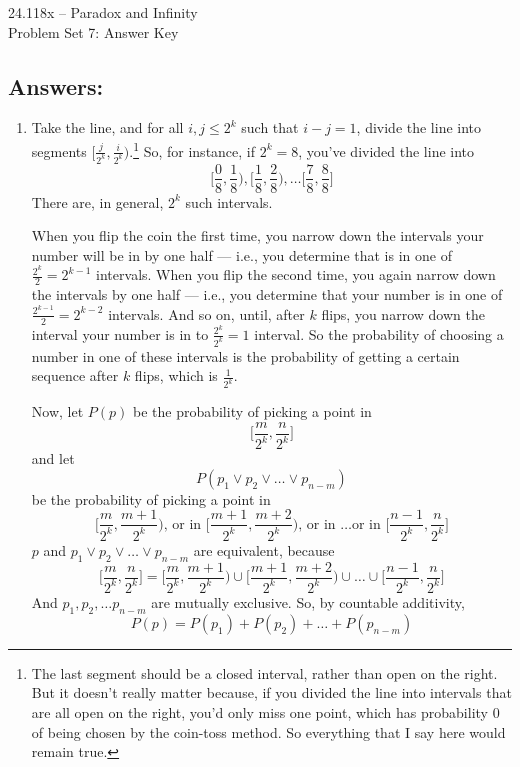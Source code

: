 \documentclass[12pt,a4paper]{article}
\begin{document}
\begin{center} {\large 24.118x -- Paradox and Infinity \\ \vspace{1mm}}
 {\large Problem Set 7: Answer Key \\ \vspace{1mm}}
 
\end{center}
\vspace{3mm}


\subsection*{Answers:}


\begin{enumerate}

\item Take the line, and for all $i,j \le 2^k$ such that $i-j=1$, divide the line into segments $[\frac{j}{2^k}, \frac{i}{2^k})$.\footnote{The last segment should be a closed interval, rather than open on the right. But it doesn't really matter because, if you divided the line into intervals that are all open on the right, you'd only miss one point, which has probability 0 of being chosen by the coin-toss method. So everything that I say here would remain true.} So, for instance, if $2^k=8$, you've divided the line into $$\big[\frac{0}{8}, \frac{1}{8}\big), \big[\frac{1}{8}, \frac{2}{8}\big), \ldots \big[\frac{7}{8}, \frac{8}{8}\big]$$ There are, in general, $2^k$ such intervals. 

When you flip the coin the first time, you narrow down the intervals your number will be in by one half --- i.e., you determine that is in one of $\frac{2^k}{2} = 2^{k-1}$ intervals. When you flip the second time, you again narrow down the intervals by one half --- i.e., you determine that your number is in one of $\frac{2^{k-1}}{2}=2^{k-2}$ intervals. And so on, until, after $k$ flips, you narrow down the interval your number is in to $\frac{2^k}{2^k}=1$ interval. So the probability of choosing a number in one of these intervals is the probability of getting a certain sequence after $k$ flips, which is $\frac{1}{2^k}$.

Now, let $P(p)$ be the probability of picking a point in $$\big[\frac{m}{2^k},\frac{n}{2^k}\big]$$ and let $$P(p_1 \vee p_2 \vee \ldots \vee p_{n-m})$$ be the probability of picking a point in$$\big[\frac{m}{2^k},\frac{m+1}{2^k}\big)\text{, or in }\big[\frac{m+1}{2^k}, \frac{m+2}{2^k}\big)\text{, or in \ldots or in }\big[\frac{n-1}{2^k}, \frac{n}{2^k}\big]$$ $p$ and $p_1\vee p_2\vee\ldots\vee p_{n-m}$ are equivalent, because  $$\big[\frac{m}{2^k},\frac{n}{2^k}\big] = \big[\frac{m}{2^k},\frac{m+1}{2^k}\big) \cup \big[\frac{m+1}{2^k}, \frac{m+2}{2^k}\big) \cup \ldots \cup \big[\frac{n-1}{2^k}, \frac{n}{2^k}\big]$$ And $p_1, p_2, \ldots p_{n-m}$ are mutually exclusive. So, by countable additivity, $$P(p)=P(p_1)+P(p_2)+\ldots+P(p_{n-m})$$


\end{enumerate}
\end{document}
